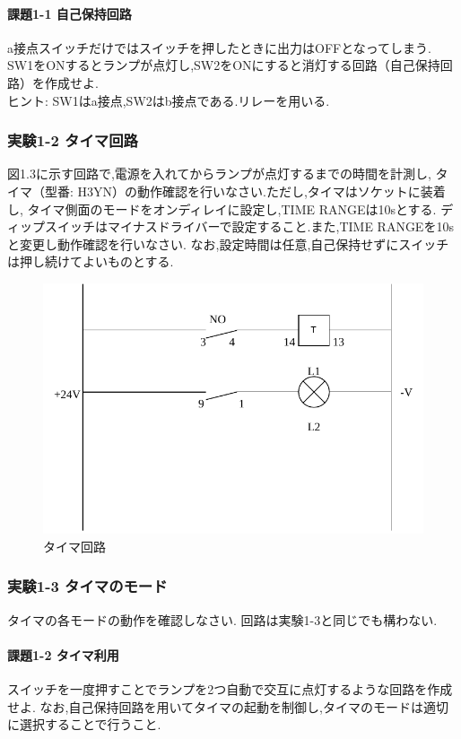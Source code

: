 \paragraph{課題1-1 自己保持回路}
a接点スイッチだけではスイッチを押したときに出力はOFFとなってしまう.
SW1をONするとランプが点灯し,SW2をONにすると消灯する回路（自己保持回路）を作成せよ.\\
ヒント: SW1はa接点,SW2はb接点である.リレーを用いる.

\subsubsection{実験1-2 タイマ回路}
図1.3に示す回路で,電源を入れてからランプが点灯するまでの時間を計測し,
タイマ（型番: H3YN）の動作確認を行いなさい.ただし,タイマはソケットに装着し,
タイマ側面のモードをオンディレイに設定し,TIME RANGEは10sとする.
ディップスイッチはマイナスドライバーで設定すること.また,TIME RANGEを10sと変更し動作確認を行いなさい.
なお,設定時間は任意,自己保持せずにスイッチは押し続けてよいものとする.

\begin{figure}[H]
  \centering
  \includegraphics[scale=0.5]{sozai/2.pdf}
  \caption{タイマ回路}
\end{figure}

\subsubsection{実験1-3 タイマのモード}
タイマの各モードの動作を確認しなさい.
回路は実験1-3と同じでも構わない.

\paragraph{課題1-2 タイマ利用}
スイッチを一度押すことでランプを2つ自動で交互に点灯するような回路を作成せよ.
なお,自己保持回路を用いてタイマの起動を制御し,タイマのモードは適切に選択することで行うこと.\\

